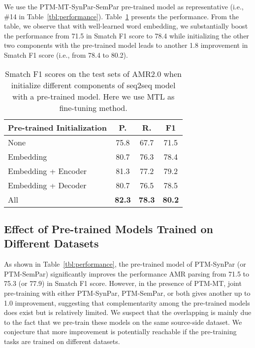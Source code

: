\documentclass[11pt,a4paper]{article}
\begin{document}
We use the PTM-MT-SynPar-SemPar pre-trained model as representative (i.e., \#14 in Table~\ref{tbl:performance}). Table~\ref{tbl:ablation} presents the performance. From the table, we observe that with well-learned word embedding, we substantially boost the performance from 71.5 in Smatch F1 score to 78.4 while initializing the other two components with the pre-trained model leads to another 1.8 improvement in Smatch F1 score (i.e., from 78.4 to 80.2). 

\begin{table}[t]
    \centering
    \small
    \begin{tabular}{l|ccc}
    \hline
       \bf Pre-trained Initialization  & \bf P. & \bf R. & \bf F1 \\
       \hline
       None & 75.8 & 67.7 & 71.5 \\
       \hline
       Embedding & 80.7 & 76.3 & 78.4\\
       Embedding + Encoder & 81.3 & 77.2 & 79.2 \\
       Embedding + Decoder & 80.7 & 76.5 & 78.5 \\
       \hline
       All  & \bf 82.3 & \bf 78.3 & \bf 80.2\\
        \hline
    \end{tabular}
    \caption{Smatch F1 scores on the test sets of AMR2.0 when initialize different components of seq2seq model with a pre-trained model. Here we use MTL as fine-tuning method.}
    \label{tbl:ablation}
\end{table}

\subsection{Effect of Pre-trained Models Trained on Different Datasets}
As shown in Table~\ref{tbl:performance}, the pre-trained model of PTM-SynPar (or PTM-SemPar) significantly improves the performance AMR parsing from 71.5 to 75.3 (or 77.9) in Smatch F1 score. However, in the presence of PTM-MT, joint pre-training with either PTM-SynPar, PTM-SemPar, or both gives another up to 1.0 improvement, suggesting that complementarity among the pre-trained models does exist but is relatively limited. We suspect that the overlapping is mainly due to the fact that we pre-train these models on the same source-side dataset. We conjecture that more improvement is potentially reachable if the pre-training tasks are trained on different datasets.  
\end{document}
